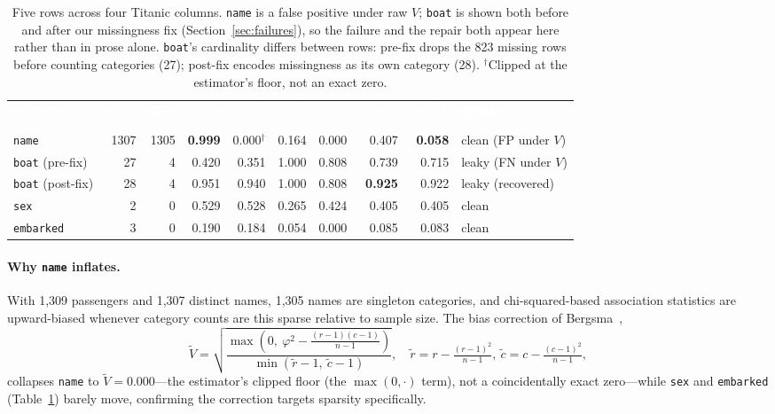\documentclass[sigconf,anonymous=false]{acmart}
\begin{document}
\begin{table}[t]
\centering
\caption{Five rows across four Titanic columns. \texttt{name} is a false
  positive under raw $V$; \texttt{boat} is shown both before and after our
  missingness fix (Section~\ref{sec:failures}), so the failure and the
  repair both appear here rather than in prose alone. \texttt{boat}'s
  cardinality differs between rows: pre-fix drops the 823 missing rows
  before counting categories (27); post-fix encodes missingness as its own
  category (28). $^\dagger$Clipped at the estimator's floor, not an exact
  zero.}
\label{tab:main}
\small
\begin{tabular}{lrrrrrrrrl}
\toprule
\rowcolor{diagAccent}
\textcolor{white}{\textbf{Feature}} & \textcolor{white}{Card.} & \textcolor{white}{Sing.} & \textcolor{white}{$V$} & \textcolor{white}{$\widetilde{V}$} & \textcolor{white}{$\widetilde{I}$} & \textcolor{white}{$\pi$} & \textcolor{white}{$\mathcal{L}(V)$} & \textcolor{white}{$\mathcal{L}(\widetilde{V})$} & \textcolor{white}{\textbf{Truth}} \\
\rowcolor{flagRedSoft}
\texttt{name}     & 1307 & 1305 & \textbf{0.999} & 0.000$^\dagger$ & 0.164 & 0.000 & 0.407 & \textbf{0.058} & clean (FP under $V$) \\
\rowcolor{flagRedSoft}
\texttt{boat} (pre-fix)  & 27 & 4 & 0.420 & 0.351 & 1.000 & 0.808 & 0.739 & 0.715 & leaky (FN under $V$) \\
\texttt{boat} (post-fix) & 28 & 4 & 0.951 & 0.940 & 1.000 & 0.808 & \textbf{0.925} & 0.922 & leaky (recovered) \\
\texttt{sex}      & 2    & 0    & 0.529 & 0.528 & 0.265 & 0.424 & 0.405 & 0.405 & clean \\
\texttt{embarked} & 3    & 0    & 0.190 & 0.184 & 0.054 & 0.000 & 0.085 & 0.083 & clean \\
\bottomrule
\end{tabular}
\end{table}

\paragraph{Why \texttt{name} inflates.}
With 1{,}309 passengers and 1{,}307 distinct names, 1{,}305 names are
singleton categories, and chi-squared-based association statistics are
upward-biased whenever category counts are this sparse relative to sample
size. The bias correction of Bergsma~\cite{bergsma2013bias},
\[
\widetilde{V} = \sqrt{\frac{\max(0,\ \varphi^2 - \frac{(r-1)(c-1)}{n-1})}{\min(\tilde r - 1,\ \tilde c - 1)}},
\quad \tilde r = r - \tfrac{(r-1)^2}{n-1},\ \tilde c = c - \tfrac{(c-1)^2}{n-1},
\]
collapses \texttt{name} to $\widetilde{V}=0.000$---the estimator's clipped
floor (the $\max(0,\cdot)$ term), not a coincidentally exact zero---while
\texttt{sex} and \texttt{embarked} (Table~\ref{tab:main}) barely move,
confirming the correction targets sparsity specifically.
\end{document}
